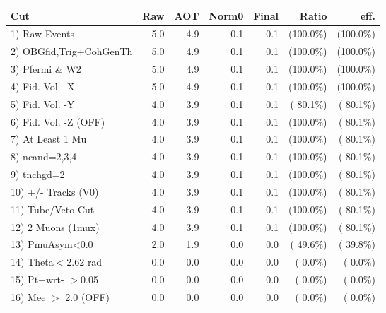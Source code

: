  \begin{table}[h!]\centering
 \begin{tabular}{||l||r|r|r|r|r|r||}
 \hline
 \hline
 Cut & Raw & AOT & Norm0 & Final & Ratio & eff.       \\
 \hline
  1) Raw Events           &          5.0 &          4.9 &          0.1 &          0.1 & (100.0\%) & (100.0\%) \\
  2) OBGfid,Trig+CohGenTh &          5.0 &          4.9 &          0.1 &          0.1 & (100.0\%) & (100.0\%) \\
  3) Pfermi \& W2         &          5.0 &          4.9 &          0.1 &          0.1 & (100.0\%) & (100.0\%) \\
  4) Fid. Vol. -X         &          5.0 &          4.9 &          0.1 &          0.1 & (100.0\%) & (100.0\%) \\
  5) Fid. Vol. -Y         &          4.0 &          3.9 &          0.1 &          0.1 & ( 80.1\%) & ( 80.1\%) \\
  6) Fid. Vol. -Z (OFF)   &          4.0 &          3.9 &          0.1 &          0.1 & (100.0\%) & ( 80.1\%) \\
  7) At Least 1 Mu        &          4.0 &          3.9 &          0.1 &          0.1 & (100.0\%) & ( 80.1\%) \\
  8) ncand=2,3,4          &          4.0 &          3.9 &          0.1 &          0.1 & (100.0\%) & ( 80.1\%) \\
  9) tnchgd=2             &          4.0 &          3.9 &          0.1 &          0.1 & (100.0\%) & ( 80.1\%) \\
 10) +/- Tracks (V0)      &          4.0 &          3.9 &          0.1 &          0.1 & (100.0\%) & ( 80.1\%) \\
 11) Tube/Veto Cut        &          4.0 &          3.9 &          0.1 &          0.1 & (100.0\%) & ( 80.1\%) \\
 12) 2 Muons (1mux)       &          4.0 &          3.9 &          0.1 &          0.1 & (100.0\%) & ( 80.1\%) \\
 13) PmuAsym<0.0          &          2.0 &          1.9 &          0.0 &          0.0 & ( 49.6\%) & ( 39.8\%) \\
 14) Theta$<$2.62 rad     &          0.0 &          0.0 &          0.0 &          0.0 & (  0.0\%) & (  0.0\%) \\
 15) Pt+wrt- $>$0.05      &          0.0 &          0.0 &          0.0 &          0.0 & (  0.0\%) & (  0.0\%) \\
 16) Mee $>$ 2.0  (OFF)   &          0.0 &          0.0 &          0.0 &          0.0 & (  0.0\%) & (  0.0\%) \\

\end{tabular}
\end{table}

